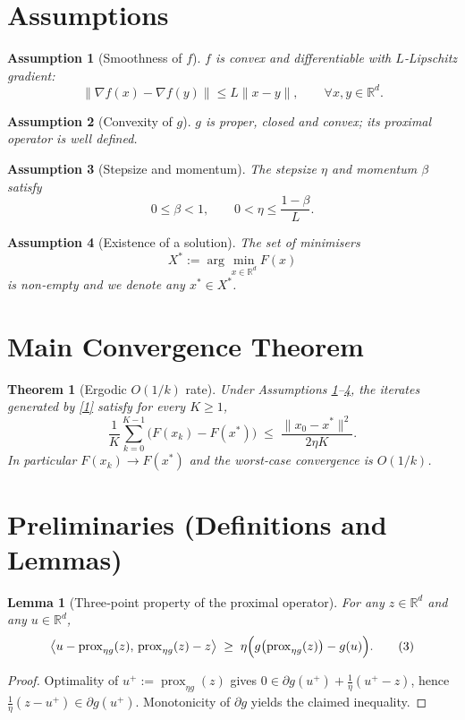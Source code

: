 \documentclass{article}
\newtheorem{theorem}{Theorem}
\newtheorem{lemma}{Lemma}
\newtheorem{assumption}{Assumption}
\newcommand{\prox}{\operatorname{prox}}
\newcommand{\R}{\mathbb{R}}
\begin{document}
\section*{Assumptions}
\begin{assumption}[Smoothness of $f$]\label{ass:smooth}
$f$ is convex and differentiable with $L$‑Lipschitz gradient:
\[
\|\nabla f(x)-\nabla f(y)\|\le L\|x-y\|,\qquad \forall x,y\in\R^{d}.
\tag{A1}
\]
\end{assumption}
\begin{assumption}[Convexity of $g$]\label{ass:convex}
$g$ is proper, closed and convex; its proximal operator is well defined.
\end{assumption}
\begin{assumption}[Stepsize and momentum]\label{ass:param}
The stepsize $\eta$ and momentum $\beta$ satisfy
\[
0\le\beta<1,\qquad 0<\eta\le\frac{1-\beta}{L}.
\tag{A3}
\]
\end{assumption}
\begin{assumption}[Existence of a solution]\label{ass:opt}
The set of minimisers 
\[
X^{*}:=\arg\min_{x\in\R^{d}}F(x)
\]
is non‑empty and we denote any $x^{*}\in X^{*}$.
\end{assumption}

\section*{Main Convergence Theorem}
\begin{theorem}[Ergodic $O(1/k)$ rate]\label{thm:rate}
Under Assumptions \ref{ass:smooth}–\ref{ass:opt}, the iterates generated by \eqref{1} satisfy for every $K\ge1$,
\[
\frac{1}{K}\sum_{k=0}^{K-1}\bigl(F(x_{k})-F(x^{*})\bigr)
\;\le\;
\frac{\|x_{0}-x^{*}\|^{2}}{2\eta K}.
\tag{2}
\]
In particular $F(x_{k})\to F(x^{*})$ and the worst‑case convergence is $O(1/k)$.
\end{theorem}

\section*{Preliminaries (Definitions and Lemmas)}
\begin{lemma}[Three‑point property of the proximal operator]\label{lem:three}
For any $z\in\R^{d}$ and any $u\in\R^{d}$,
\[
\bigl\langle u-\prox_{\eta g}(z),\,\prox_{\eta g}(z)-z\bigr\rangle
\;\ge\;\eta\Bigl(g\bigl(\prox_{\eta g}(z)\bigr)-g(u)\Bigr).
\tag{3}
\]
\end{lemma}
\begin{proof}
Optimality of $u^{+}:=\prox_{\eta g}(z)$ gives
$0\in \partial g(u^{+})+\frac1\eta(u^{+}-z)$,
hence $\frac1\eta(z-u^{+})\in\partial g(u^{+})$.  
Monotonicity of $\partial g$ yields the claimed inequality. \qedhere
\end{proof}
\end{document}
